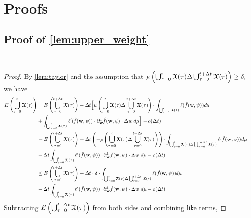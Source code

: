 \section{Proofs}
\subsection{Proof of \cref{lem:upper_weight}}~\label{sec:upper_weight}
\begin{proof}
    By \cref{lem:taylor} and the assumption that $\mu\left( \bigcup_{\tau = 0}^{t}\boldsymbol{\mathcal{X}}(\tau)\Delta \bigcup_{\tau = 0}^{t+\Delta t}\boldsymbol{\mathcal{X}}(\tau)\right)\geq \delta,$ we have
    \begin{align*}
       E\left(\bigcup_{\tau = 0}^{t}\boldsymbol{\mathcal{X}}(\tau)\right) & = E\left(\bigcup_{\tau = 0}^{t+\Delta t}\boldsymbol{\mathcal{X}}(\tau)\right) - \Delta t\Big[\mu\left( \bigcup_{\tau = 0}^{t}\boldsymbol{\mathcal{X}}(\tau)\Delta \bigcup_{\tau = 0}^{t+\Delta t}\boldsymbol{\mathcal{X}}(\tau)\right)\cdot \displaystyle\int_{\bigcup_{\tau = 0}^{t}\boldsymbol{\mathcal{X}}(\tau)} \ell(\hat{f}(\boldsymbol{\mathrm{w}},\psi))d\mu\\
        & +\displaystyle\int_{\bigcup_{\tau = 0}^{t}\boldsymbol{\mathcal{X}}(\tau)} \ell'(\hat{f}(\boldsymbol{\mathrm{w}},\psi))\cdot \partial_{\boldsymbol{\mathrm{w}}}^1 \hat{f}(\boldsymbol{\mathrm{w}},\psi)\cdot \Delta w \hspace{1mm}  d\mu\Big]- o(\Delta t)\\
        & = E\left(\bigcup_{\tau = 0}^{t+\Delta t}\boldsymbol{\mathcal{X}}(\tau)\right) + \Delta t\left(-\mu\left( \bigcup_{\tau = 0}^{t}\boldsymbol{\mathcal{X}}(\tau)\Delta \bigcup_{\tau = 0}^{t+\Delta t}\boldsymbol{\mathcal{X}}(\tau)\right)\right)\cdot \displaystyle\int_{\bigcup_{\tau = 0}^{t}\boldsymbol{\mathcal{X}}(\tau)\Delta \bigcup_{\tau = 0}^{t+\Delta t}\boldsymbol{\mathcal{X}}(\tau)} \ell(\hat{f}(\boldsymbol{\mathrm{w}},\psi))d\mu\\
        & - \Delta t\displaystyle\int_{\bigcup_{\tau = 0}^{t}\boldsymbol{\mathcal{X}}(\tau)} \ell'(\hat{f}(\boldsymbol{\mathrm{w}},\psi))\cdot \partial_{\boldsymbol{\mathrm{w}}}^1 \hat{f}(\boldsymbol{\mathrm{w}},\psi)\cdot \Delta w \hspace{1mm}  d\mu- o(\Delta t)\\
        & \leq E\left(\bigcup_{\tau = 0}^{t+\Delta t}\boldsymbol{\mathcal{X}}(\tau)\right) + \Delta t \cdot \delta \cdot \displaystyle\int_{\bigcup_{\tau = 0}^{t}\boldsymbol{\mathcal{X}}(\tau)\Delta \bigcup_{\tau = 0}^{t+\Delta t}\boldsymbol{\mathcal{X}}(\tau)} \ell(\hat{f}(\boldsymbol{\mathrm{w}},\psi))d\mu\\
        & - \Delta t\displaystyle\int_{\bigcup_{\tau = 0}^{t}\boldsymbol{\mathcal{X}}(\tau)} \ell'(\hat{f}(\boldsymbol{\mathrm{w}},\psi))\cdot \partial_{\boldsymbol{\mathrm{w}}}^1 \hat{f}(\boldsymbol{\mathrm{w}},\psi)\cdot \Delta w \hspace{1mm}  d\mu- o(\Delta t)\\
    \end{align*}
    Subtracting $E\left(\bigcup_{\tau = 0}^{t+\Delta t}\boldsymbol{\mathcal{X}}(\tau)\right)$ from both sides and combining like terms,

\end{proof}
